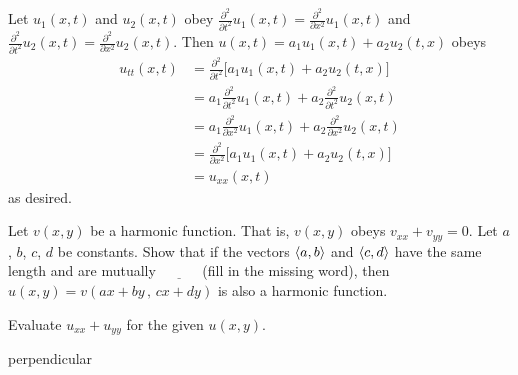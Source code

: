 \begin{solution}
Let $u_1(x,t)$ and $u_2(x,t)$ obey 
  $\frac{\partial^2}{\partial t^2}u_1(x,t)
           =\frac{\partial^2}{\partial x^2}u_1(x,t)$ and 
  $\frac{\partial^2}{\partial t^2}u_2(x,t)
           =\frac{\partial^2}{\partial x^2}u_2(x,t)$. Then
$u(x,t)=a_1u_1(x,t)+a_2u_2(t,x)$ obeys
\begin{align*}
u_{tt}(x,t) &= \frac{\partial^2}{\partial t^2}
                       \big[a_1u_1(x,t)+a_2u_2(t,x)\big] \\
&=a_1\frac{\partial^2}{\partial t^2}u_1(x,t) 
 + a_2\frac{\partial^2}{\partial t^2}u_2(x,t) \\
&=a_1\frac{\partial^2}{\partial x^2}u_1(x,t) 
     + a_2\frac{\partial^2}{\partial x^2}u_2(x,t) \\
&= \frac{\partial^2}{\partial x^2}\big[a_1u_1(x,t)+a_2u_2(t,x)\big] \\
&=u_{xx}(x,t)
\end{align*}
as desired.
\end{solution}

\begin{question}
Let $v(x,y)$ be a harmonic function. That is, $v(x,y)$ obeys $v_{xx}+v_{yy}=0$. Let $a$, $b$, $c$, $d$ be constants.
Show that if the vectors $\left< a,b\right>$ and $\left< c,d\right>$ have the same length
and are mutually $\underline{\ \ \ \ \ \ \ \ \ \ \ \ }$ (fill in the missing word),  then $u(x,y)=v(ax+by\,,\,cx+dy)$ is also a harmonic function.
\end{question}

\begin{hint}
Evaluate $u_{xx}+u_{yy}$ for the given $u(x,y)$.
\end{hint}

\begin{answer}
perpendicular
\end{answer}

